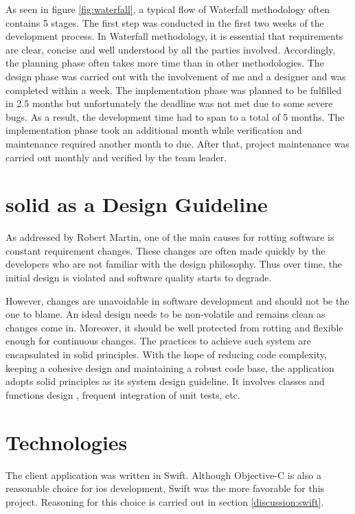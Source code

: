 \documentclass[11pt,a4paper,oneside,article]{memoir}
\begin{document}
As seen in figure \ref{fig:waterfall}, a typical flow of Waterfall methodology often contains 5 stages. The first step was conducted in the first two weeks of the development process. In Waterfall methodology, it is essential that requirements are clear, concise and well understood by all the parties involved. Accordingly, the planning phase often takes more time than in other methodologies. \cite{waterfall:rumania} The design phase was carried out with the involvement of me and a designer and was completed within a week. The implementation phase was planned to be fulfilled in 2.5 months but unfortunately the deadline was not met due to some severe bugs. As a result, the development time had to span to a total of 5 months. The implementation phase took an additional month while verification and maintenance required another month to due. After that, project maintenance was carried out monthly and verified by the team leader.

\section{\gls{solid} as a Design Guideline}
As addressed by Robert Martin, one of the main causes for rotting software is constant requirement changes. These changes are often made quickly by the developers who are not familiar with the design philosophy. Thus over time, the initial design is violated and software quality starts to degrade. \cite[chapter 7]{unclebob:agile}

However, changes are unavoidable in software development and should not be the one to blame. An ideal design needs to be non-volatile and remains clean as changes come in. Moreover, it should be well protected from rotting and flexible enough for continuous changes. The practices to achieve such system are encapsulated in \gls{solid} principles. \cite[chapter 7]{unclebob:agile} With the hope of reducing code complexity, keeping a cohesive design and maintaining a robust code base, the application adopts \gls{solid} principles as its system design guideline. It involves classes and functions design , frequent integration of unit tests, etc. 

\section{Technologies}
The client application was written in Swift. Although Objective-C is also a reasonable choice for \gls{ios} development, Swift was the more favorable for this project. Reasoning for this choice is carried out in section \ref{discussion:swift}. 
\end{document}
